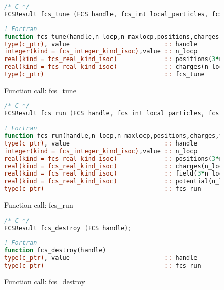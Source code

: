 \begin{figure}[htb]
\begin{lstlisting}[language=C,frame=trBL,breaklines,basicstyle=\ttfamily,prebreak={\raisebox{0ex}[0ex][0ex]{\ensuremath{\hookleftarrow}}}]
/* C */
FCSResult fcs_tune (FCS handle, fcs_int local_particles, fcs_float *positions, fcs_float *charges);
\end{lstlisting}
\begin{lstlisting}[language=Fortran,frame=trBL,breaklines,basicstyle=\ttfamily,prebreak={\raisebox{0ex}[0ex][0ex]{\ensuremath{\hookleftarrow}}}]
! Fortran
function fcs_tune(handle,n_locp,n_maxlocp,positions,charges)
type(c_ptr), value                          :: handle
integer(kind = fcs_integer_kind_isoc),value :: n_locp
real(kind = fcs_real_kind_isoc)             :: positions(3*n_locp)
real(kind = fcs_real_kind_isoc)             :: charges(n_locp)
type(c_ptr)                                 :: fcs_tune
\end{lstlisting}
\caption{Function call: fcs\_tune}
\label{fig:fcs_tune}
\end{figure}
\begin{figure}[htb]
\begin{lstlisting}[language=C,frame=trBL,breaklines,basicstyle=\ttfamily,prebreak={\raisebox{0ex}[0ex][0ex]{\ensuremath{\hookleftarrow}}}]
/* C */
FCSResult fcs_run (FCS handle, fcs_int local_particles, fcs_float *positions, fcs_float *charges, fcs_float *field, fcs_float *potentials);
\end{lstlisting}
\begin{lstlisting}[language=Fortran,frame=trBL,breaklines,basicstyle=\ttfamily,prebreak={\raisebox{0ex}[0ex][0ex]{\ensuremath{\hookleftarrow}}}]
! Fortran
function fcs_run(handle,n_locp,n_maxlocp,positions,charges,field,potential)
type(c_ptr), value                          :: handle
integer(kind = fcs_integer_kind_isoc),value :: n_locp
real(kind = fcs_real_kind_isoc)             :: positions(3*n_locp)
real(kind = fcs_real_kind_isoc)             :: charges(n_locp)
real(kind = fcs_real_kind_isoc)             :: field(3*n_locp)
real(kind = fcs_real_kind_isoc)             :: potential(n_locp)
type(c_ptr)                                 :: fcs_run
\end{lstlisting}
\caption{Function call: fcs\_run}
\label{fig:fcs_run}
\end{figure}
\begin{figure}[htb]
\begin{lstlisting}[language=C,frame=trBL,breaklines,basicstyle=\ttfamily,prebreak={\raisebox{0ex}[0ex][0ex]{\ensuremath{\hookleftarrow}}}]
/* C */
FCSResult fcs_destroy (FCS handle);
\end{lstlisting}
\begin{lstlisting}[language=Fortran,frame=trBL,breaklines,basicstyle=\ttfamily,prebreak={\raisebox{0ex}[0ex][0ex]{\ensuremath{\hookleftarrow}}}]
! Fortran
function fcs_destroy(handle)
type(c_ptr), value                          :: handle
type(c_ptr)                                 :: fcs_run
\end{lstlisting}
\caption{Function call: fcs\_destroy}
\label{fig:fcs_destroy}
\end{figure}
\FloatBarrier
